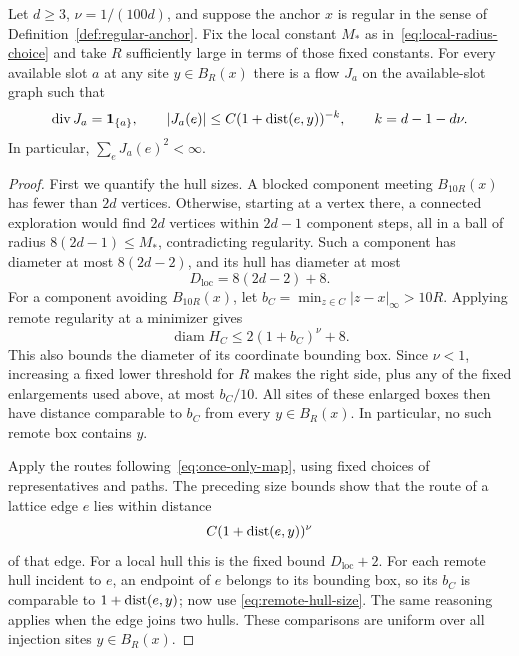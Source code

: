 \begin{proposition}\label{prop:flow-decay}
Let $d\ge3$, $\nu=1/(100d)$, and suppose the anchor $x$ is regular in the
sense of Definition~\ref{def:regular-anchor}.  Fix the local constant
$M_*$ as in~\eqref{eq:local-radius-choice} and take $R$ sufficiently
large in terms of those fixed constants.  For every available slot $a$
at any site $y\in B_R(x)$ there is a flow $J_a$ on the available-slot
graph such that
\begin{equation}\label{eq:flow-envelope}
 \operatorname{div}J_a=\mathbf 1_{\{a\}},\qquad
 |J_a(e)|\le C(1+\operatorname{dist}(e,y))^{-k},
 \qquad k=d-1-d\nu.
\end{equation}
In particular, $\sum_e J_a(e)^2<\infty$.
\end{proposition}

\begin{proof}
First we quantify the hull sizes.  A blocked component meeting $B_{10R}(x)$
has fewer than $2d$ vertices.  Otherwise, starting at a vertex there,
a connected exploration would find $2d$ vertices within $2d-1$ component
steps, all in a ball of radius $8(2d-1)\le M_*$, contradicting regularity.
Such a component has diameter at most $8(2d-2)$, and its hull has diameter
at most
\[
 D_{\mathrm{loc}}=8(2d-2)+8.
\]
For a component avoiding $B_{10R}(x)$, let
$b_C=\min_{z\in C}|z-x|_\infty>10R$.  Applying remote regularity at a
minimizer gives
\begin{equation}\label{eq:remote-hull-size}
 \operatorname{diam}H_C\le 2(1+b_C)^\nu+8.
\end{equation}
This also bounds the diameter of its coordinate bounding box.  Since
$\nu<1$, increasing a fixed lower threshold for $R$ makes the right side,
plus any of the fixed enlargements used above, at most $b_C/10$.
All sites of these enlarged boxes then have distance comparable to $b_C$
from every $y\in B_R(x)$.  In particular, no such remote box contains $y$.

Apply the routes following~\eqref{eq:once-only-map}, using fixed choices
of representatives and paths.  The preceding size bounds show that the
route of a lattice edge $e$ lies within distance
\begin{equation}\label{eq:routing-displacement}
 C(1+\operatorname{dist}(e,y))^\nu
\end{equation}
of that edge.  For a local hull this is the fixed bound $D_{\mathrm{loc}}+2$.
For each remote hull incident to $e$, an endpoint of $e$ belongs to its
bounding box, so its $b_C$ is comparable to $1+\operatorname{dist}(e,y)$; now use
\eqref{eq:remote-hull-size}.  The same reasoning applies when the edge
joins two hulls.  These comparisons are uniform over all injection sites
$y\in B_R(x)$.


\end{proof}
